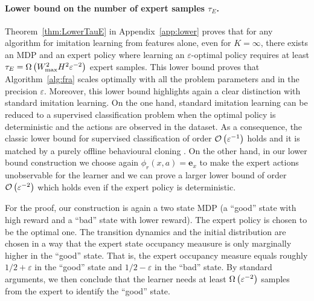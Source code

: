 \paragraph{Lower bound on the number of expert samples $\tau_E$.}
Theorem~\ref{thm:LowerTauE} in Appendix~\ref{app:lower} proves 
that for any algorithm for imitation learning from features alone, even for $K=\infty$,
there exists an MDP and an expert policy where learning an $\varepsilon$-optimal policy requires at least 
$\tau_E =\Omega\left({W_{\max}^2 H^2\varepsilon^{-2}}\right)$ expert samples.
This lower bound proves that Algorithm~\ref{alg:fra} scales optimally with all the problem parameters 
and in the precision $\varepsilon$. Moreover, this lower bound highlights again a clear distinction with standard 
imitation learning.
On the one hand, standard imitation learning can be reduced to a supervised 
classification problem when the optimal policy
is deterministic and the actions are observed in the dataset. As a consequence,
the classic lower bound for supervised classification of order $\mathcal{O}\left({\varepsilon^{-1}}\right)$ \citep{shalev2014understanding}
holds and it is matched by a purely offline behavioural cloning \citep{rajaraman2020toward}.
On the other hand, in our lower bound construction we choose again $\phi_r(x,a) =\mathbf{e}_x$
to make the expert actions unobservable for the learner and we can prove a larger lower bound of order $\mathcal{O}\left({\varepsilon^{-2}}\right)$
which holds even if the expert policy is deterministic.

For the proof, our construction is again a two state MDP (a ``good'' state with high reward and a ``bad'' state with 
lower reward). The expert policy is chosen to be the optimal one.
The transition dynamics and the initial distribution are chosen in a way that the expert 
state occupancy meausure is only marginally higher in the ``good'' state. That is, the 
expert occupancy measure equals roughly $1/2 + \varepsilon$ in the ``good'' state 
and  $1/2 - \varepsilon$ in the ``bad'' state.
By standard arguments, we then conclude that the learner needs at least $\Omega\left({\varepsilon^{-2}}\right)$
samples from the expert to identify the ``good'' state.





